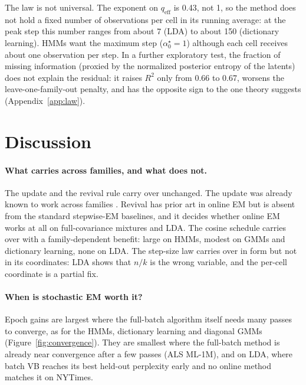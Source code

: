 \documentclass[10pt]{article}
\newcommand{\aopt}{\alpha_0^{\star}}
\newcommand{\qeff}{q_{\mathrm{eff}}}
\begin{document}
The law is not universal. The exponent on $\qeff$ is 0.43, not 1, so the method does not hold a fixed number of
observations per cell in its running average: at the peak step this number ranges from about 7 (LDA) to about 150
(dictionary learning). HMMs want the maximum step ($\aopt = 1$) although each cell receives about one observation per
step. In a further exploratory test, the fraction of missing information (proxied by the normalized posterior
entropy of the latents) does not explain the residual: it raises $R^2$ only from 0.66 to 0.67, worsens the
leave-one-family-out penalty, and has the opposite sign to the one theory suggests (Appendix~\ref{app:law}).

\section{Discussion}

\paragraph{What carries across families, and what does not.} The update and the revival rule carry over unchanged.
The update was already known to work across families \citep{liang2009online}. Revival has prior art in online EM
\citep{sato2000online,hughes2013memoized} but is absent from the standard stepwise-EM baselines, and it decides
whether online EM works at all on full-covariance mixtures and LDA. The cosine schedule carries over with a
family-dependent benefit: large on HMMs, modest on GMMs and dictionary learning, none on LDA. The step-size law carries
over in form but not in its coordinates: LDA shows that $n/k$ is the wrong variable, and the per-cell coordinate is a
partial fix.

\paragraph{When is stochastic EM worth it?} Epoch gains are largest where the full-batch algorithm itself needs many
passes to converge, as for the HMMs, dictionary learning and diagonal GMMs (Figure~\ref{fig:convergence}). They are
smallest where the full-batch method is already near convergence after a few passes (ALS ML-1M), and on LDA, where
batch VB reaches its best held-out perplexity early and no online method matches it on NYTimes.
\end{document}
